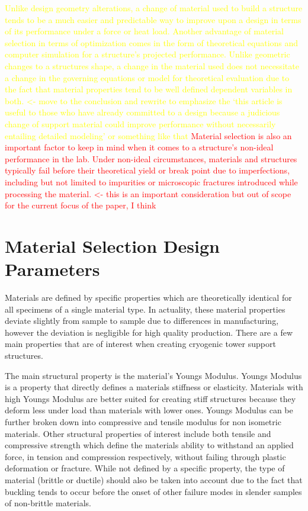 \documentclass[final]{svjour2}
\begin{document}
\textcolor{yellow}{Unlike design geometry alterations, a change of material used to build a structure tends to be a much easier and predictable way to improve upon a design in terms of its performance under a force or heat load. Another advantage of material selection in terms of optimization comes in the form of theoretical equations and computer simulation for a structure's projected performance.  Unlike geometric changes to a structures shape, a change in the material used does not necessitate a change in the governing equations or model for theoretical evaluation due to the fact that material properties tend to be well defined dependent variables in both. <- move to the conclusion and rewrite to emphasize the `this article is useful to those who have already committed to a design because a judicious change of support material could improve performance without necessarily entailing detailed modeling' or something like that}
\textcolor{red}{Material selection is also an important factor to keep in mind when it comes to a structure's non-ideal performance in the lab. Under non-ideal circumstances, materials and structures typically fail before their theoretical yield or break point due to imperfections, including but not limited to impurities or microscopic fractures introduced while processing the material. <- this is an important consideration but out of scope for the current focus of the paper, I think}

\section{Material Selection Design Parameters}

Materials are defined by specific properties which are theoretically identical for all specimens of a single material type.  In actuality, these material properties deviate slightly from sample to sample due to differences in manufacturing, however the deviation is negligible for high quality production.  There are a few main properties that are of interest when creating cryogenic tower support structures.  

The main structural property is the material's Youngs Modulus.  Youngs Modulus is a property that directly defines a materials stiffness or elasticity.  Materials with high Youngs Modulus are better suited for creating stiff structures because they deform less under load than materials with lower ones.  Youngs Modulus can be further broken down into compressive and tensile modulus for non isometric materials. Other structural properties of interest include both tensile and compressive strength which define the materials ability to withstand an applied force, in tension and compression respectively, without failing through plastic deformation or fracture.  While not defined by a specific property, the type of material (brittle or ductile) should also be taken into account due to the fact that buckling tends to occur before the onset of other failure modes in slender samples of non-brittle materials.  
\end{document}
